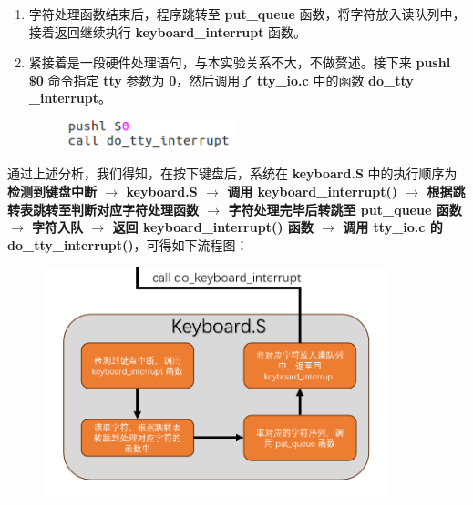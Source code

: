 \begin{enumerate}
\begin{itemize}
\begin{figure}[htbp]
                            \end{figure}
                    \end{itemize}
                \item 字符处理函数结束后，程序跳转至 \textbf{put\_queue} 函数，将字符放入读队列中，接着返回继续执行 \textbf{keyboard\_interrupt} 函数。
                \newpage
                \item 紧接着是一段硬件处理语句，与本实验关系不大，不做赘述。接下来 \textbf{pushl \$0} 命令指定 \textbf{tty} 参数为 \textbf{0}，然后调用了 \textbf{tty\_io.c} 中的函数 \textbf{do\_tty \_interrupt}。
                \begin{figure}[htbp]
                    \hspace*{2.3cm}
                    \includegraphics*[width = 5cm]{s0_5.png}   
                \end{figure}
            \end{enumerate}
            \par 通过上述分析，我们得知，在按下键盘后，系统在 \textbf{keyboard.S} 中的执行顺序为 \textbf{检测到键盘中断 $\rightarrow$ keyboard.S $\rightarrow$ 调用 keyboard\_interrupt() $\rightarrow$ 根据跳转表跳转至判断对应字符处理函数 $\rightarrow$ 字符处理完毕后转跳至 put\_queue 函数 $\rightarrow$ 字符入队 $\rightarrow$ 返回 keyboard\_interrupt() 函数 $\rightarrow$ 调用 tty\_io.c 的 do\_tty\_interrupt()}，可得如下流程图：
            \begin{figure}[htbp]
                \centering
                \includegraphics*[width = 10cm]{s0_6.png}
            \end{figure}
